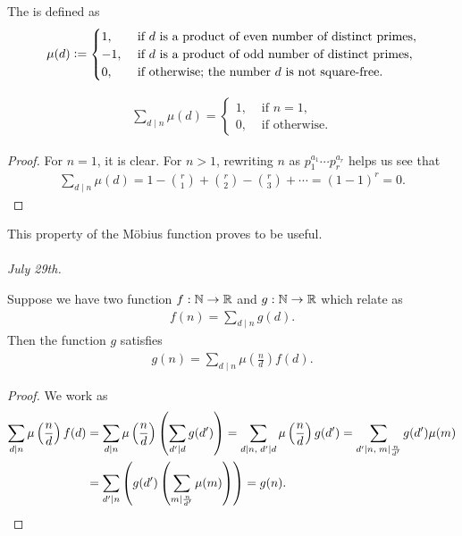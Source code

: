 The  is defined as
\begin{equation}
    \mu(d) \vcentcolon= \begin{cases}
        1, &\text{ if } d \text{ is a product of even number of distinct primes},\\
        -1, &\text{ if } d \text{ is a product of odd number of distinct primes},\\
        0, &\text{ if otherwise; the number } d \text{ is not square-free.}
    \end{cases}
\end{equation}

\begin{theorem}
    \begin{align}
        \sum_{d \mid n} \mu(d) = \begin{cases}
            1, &\text{ if } n = 1,\\
            0, &\text{ if otherwise.}
        \end{cases}
    \end{align}
\end{theorem}

\begin{proof}
    For $n = 1$, it is clear. For $n > 1$, rewriting $n$ as $p_{1}^{a_{1}} \cdots p_{r}^{a_{r}}$ helps us see that
    \begin{align}
        \sum_{d \mid n} \mu(d) = 1 - \binom{r}{1} + \binom{r}{2} - \binom{r}{3} + \cdots = (1-1)^{r} = 0.
    \end{align}
\end{proof}

This property of the M\"obius function proves to be useful.\\ \\
\textit{July 29th.}

\begin{theorem}
    Suppose we have two function $f: \mathbb{N} \to \mathbb{R}$ and $g:\mathbb{N} \to \mathbb{R}$ which relate as
    \begin{align}
        f(n) = \sum_{d \mid n} g(d).
    \end{align}
    Then the function $g$ satisfies
    \begin{align}
        g(n) = \sum_{d \mid n} \mu\left( \frac{n}{d} \right)f(d).
    \end{align}
\end{theorem}

\begin{proof}
    We work as
    \begin{align}
        \sum_{d \mid n} \mu \left( \frac{n}{d} \right) f(d) &= \sum_{d \mid n} \mu\left(  \frac{n}{d} \right) \left( \sum_{d'\mid d} g(d') \right) = \sum_{d \mid n,\; d'\mid d} \mu \left( \frac{n}{d} \right) g(d') = \sum_{d' \mid n,\; m \mid \frac{n}{d'}} g(d') \mu(m) \notag \\
        &= \sum_{d' \mid n} \left( g(d') \left( \sum_{m \mid \frac{n}{d'}} \mu(m) \right) \right) = g(n).
    \end{align}
\end{proof}

